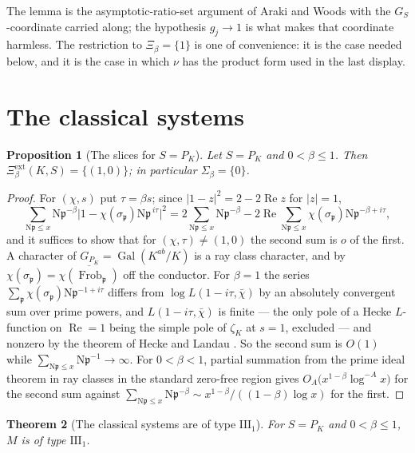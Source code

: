 \documentclass[11pt]{amsart}
\numberwithin{equation}{section}
\newtheorem{theorem}{Theorem}[section]
\newtheorem{proposition}[theorem]{Proposition}
\theoremstyle{definition}
\theoremstyle{remark}
\newcommand{\pp}{\mathfrak{p}}
\newcommand{\Ns}{\mathrm{N}}
\newcommand{\Frob}{\operatorname{Frob}}
\newcommand{\Gal}{\operatorname{Gal}}
\newcommand{\Xiext}{\Xi^{\mathrm{ext}}_\beta}
\begin{document}
The lemma is the asymptotic-ratio-set argument of Araki and Woods \cite{AW} with the
$G_S$-coordinate carried along; the hypothesis $g_j\to1$ is what makes that coordinate
harmless. The restriction to $\Xi_\beta=\{1\}$ is one of convenience: it is the case needed
below, and it is the case in which $\nu$ has the product form used in the last display.

\section{The classical systems}\label{sec:classical}

\begin{proposition}[The slices for $S=P_K$]\label{prop:slices}
Let $S=P_K$ and $0<\beta\le1$. Then $\Xiext(K,S)=\{(1,0)\}$; in particular
$\Sigma_\beta=\{0\}$.
\end{proposition}

\begin{proof}
For $(\chi,s)$ put $\tau=\beta s$; since $|1-z|^2=2-2\operatorname{Re}z$ for $|z|=1$,
\begin{equation}\label{eq:twosums}
\sum_{\Ns\pp\le x}\Ns\pp^{-\beta}\bigl|1-\chi(\sigma_\pp)\Ns\pp^{\,i\tau}\bigr|^2
=2\sum_{\Ns\pp\le x}\Ns\pp^{-\beta}-2\operatorname{Re}\sum_{\Ns\pp\le x}\chi(\sigma_\pp)\Ns\pp^{-\beta+i\tau},
\end{equation}
and it suffices to show that for $(\chi,\tau)\ne(1,0)$ the second sum is $o$ of the first.
A character of $G_{P_K}=\Gal(K^{ab}/K)$ is a ray class character, and by
\cite[Lem.~3.8]{Main} $\chi(\sigma_\pp)=\overline{\chi(\Frob_\pp)}$ off the conductor. For
$\beta=1$ the series $\sum_\pp\chi(\sigma_\pp)\Ns\pp^{-1+i\tau}$ differs from
$\log L(1-i\tau,\bar\chi)$ by an absolutely convergent sum over prime powers, and
$L(1-i\tau,\bar\chi)$ is finite --- the only pole of a Hecke $L$-function on
$\operatorname{Re}=1$ being the simple pole of $\zeta_K$ at $s=1$, excluded --- and nonzero
by the theorem of Hecke and Landau \cite{Hecke,Landau}. So the second sum is $O(1)$ while
$\sum_{\Ns\pp\le x}\Ns\pp^{-1}\to\infty$. For $0<\beta<1$, partial summation from the prime
ideal theorem in ray classes in the standard zero-free region \cite{Landau} gives
$O_A\bigl(x^{1-\beta}\log^{-A}x\bigr)$ for the second sum against
$\sum_{\Ns\pp\le x}\Ns\pp^{-\beta}\sim x^{1-\beta}/((1-\beta)\log x)$ for the first.
\end{proof}

\begin{theorem}[The classical systems are of type $\mathrm{III}_1$]\label{thm:classical}
For $S=P_K$ and $0<\beta\le1$, $M$ is of type $\mathrm{III}_1$.
\end{theorem}
\end{document}
